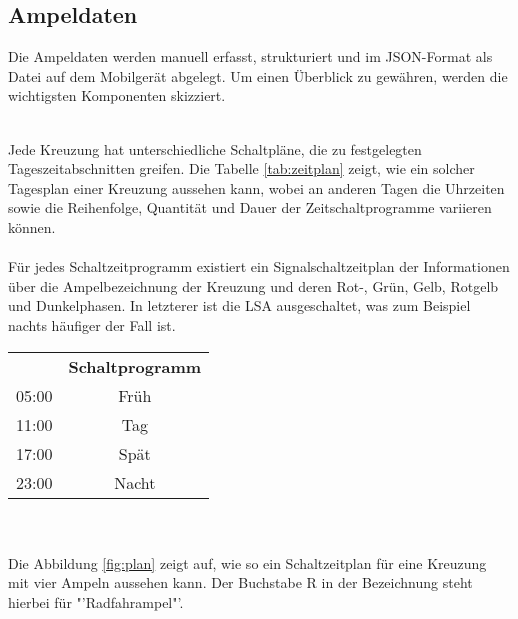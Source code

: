 \subsection{Ampeldaten}
Die Ampeldaten werden manuell erfasst, strukturiert und im \gls{JSON}-Format als Datei auf dem Mobilgerät abgelegt. Um einen Überblick zu gewähren, werden die wichtigsten Komponenten skizziert. \\\\
\begin{minipage}{0.6\textwidth}
Jede Kreuzung hat unterschiedliche Schaltpläne, die zu festgelegten Tageszeitabschnitten greifen. Die Tabelle \ref{tab:zeitplan} zeigt, wie ein solcher Tagesplan einer Kreuzung aussehen kann, wobei an anderen Tagen die Uhrzeiten sowie die Reihenfolge, Quantität und Dauer der Zeitschaltprogramme variieren können.\\\\
Für jedes Schaltzeitprogramm existiert ein Signalschaltzeitplan der Informationen über die Ampelbezeichnung der Kreuzung und deren Rot-, Grün, Gelb, Rotgelb und Dunkelphasen. In letzterer ist die \gls{LSA} ausgeschaltet, was zum Beispiel nachts häufiger der Fall ist. 
\end{minipage} \hspace{1cm}
\begin{minipage}{0.3\textwidth}
	\begin{tabular}{@{}cc@{}}
	\toprule
	\rowcolor[HTML]{ECF4FF} 
	\multicolumn{2}{l}{\cellcolor[HTML]{ECF4FF}\textsc{\centering \large Bezeichnung der Kreuzung}}   \\ \midrule
	\rowcolor[HTML]{EFEFEF} 
	\multicolumn{1}{l}{\cellcolor[HTML]{EFEFEF}\textbf{Uhrzeit}} & \multicolumn{1}{l}{\cellcolor[HTML]{EFEFEF}\textbf{Schaltprogramm}} \\ \midrule
05:00 & Früh   \\ \midrule
11:00 & Tag    \\ \midrule
17:00 & Spät   \\ \midrule
23:00 & Nacht  \\ \bottomrule

\end{tabular}
\label{tab:zeitplan}
\end{minipage}
\\ \vspace{0.5cm} \\
Die Abbildung \ref{fig:plan} zeigt auf, wie so ein Schaltzeitplan für eine Kreuzung mit vier Ampeln aussehen kann. Der Buchstabe R in der Bezeichnung steht hierbei für "'Radfahrampel"'. \\
